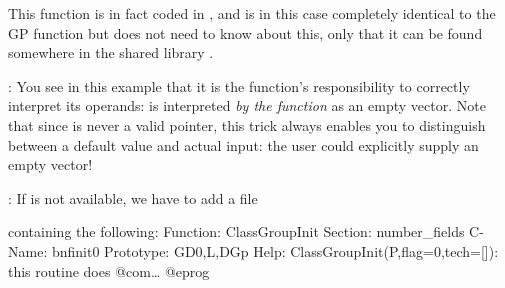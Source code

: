This function is in fact coded in , and is in this case
completely identical to the GP function  but  does not
need to know about this, only that it can be found somewhere in the shared
library .

: You see in this example that it is the
function's responsibility to correctly interpret its operands:  is interpreted \emph{by the function} as an empty vector. Note that
since  is never a valid  pointer, this trick always
enables you to distinguish between a default value and actual input: the
user could explicitly supply an empty vector!

: If  is not available, we have to add a file


\noindent containing the following:
\bprog
Function: ClassGroupInit
Section: number_fields
C-Name: bnfinit0
Prototype: GD0,L,DGp
Help: ClassGroupInit(P,{flag=0},{tech=[]}): this routine does @com\dots
@eprog
\vfill\eject
